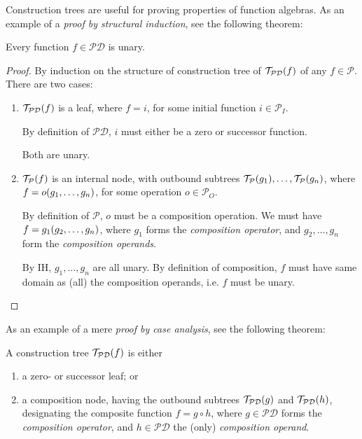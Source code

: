 Construction trees are useful for proving properties of function algebras.  As
an example of a \emph{proof by structural induction}, see the following
theorem:

\begin{theorem} \label{thm:p-functions-unary} Every function $f \in
\mathcal{PD}$ is unary. \end{theorem}

\begin{proof} By induction on the structure of construction tree of
$\mathcal{T}_\mathcal{PD}{\mathopen{}\left({f}\right)\mathclose{}}$ of any $f \in \mathcal{P}$. There are two
cases:\begin{enumerate}[label=(\arabic*)]

\item $\mathcal{T}_\mathcal{PD}{\mathopen{}\left({f}\right)\mathclose{}}$ is a leaf, where $f = i$, for some
initial function $i \in \mathcal{P}_I$.

By definition of $\mathcal{PD}$, $i$ must either be a zero or successor
function.

Both are unary.

\item $\mathcal{T}_\mathcal{P}{\mathopen{}\left({f}\right)\mathclose{}}$ is an internal node, with outbound subtrees
$\mathcal{T}_\mathcal{P}{\mathopen{}\left({g_1}\right)\mathclose{}}, \ldots, \mathcal{T}_\mathcal{P}{\mathopen{}\left({g_n}\right)\mathclose{}}$, where
$f = o{\mathopen{}\left({g_1, \ldots, g_n}\right)\mathclose{}}$, for some operation $o \in \mathcal{P}_O$.

By definition of $\mathcal{P}$, $o$ must be a composition operation. We must
have $f = g_1{\mathopen{}\left({g_2, \ldots, g_n}\right)\mathclose{}}$, where $g_1$ forms the \emph{composition
operator}, and $g_2, \ldots, g_n$ form the \emph{composition operands}.

By IH, $g_1, \ldots, g_n$ are all unary. By definition of composition, $f$ must
have same domain as (all) the composition operands, i.e. $f$ must be
unary.\end{enumerate}\end{proof}

As an example of a mere \emph{proof by case analysis}, see the following
theorem:

\begin{theorem} \label{thm:construction-tree-p} A construction tree
$\mathcal{T}_\mathcal{PD}{\mathopen{}\left({f}\right)\mathclose{}}$ is either\begin{enumerate}[label=(\arabic*)]

\item a zero- or successor leaf; or

\item a composition node, having the outbound subtrees
$\mathcal{T}_\mathcal{PD}{\mathopen{}\left({g}\right)\mathclose{}}$ and $\mathcal{T}_\mathcal{PD}{\mathopen{}\left({h}\right)\mathclose{}}$,
designating the composite function $f = g \circ h$, where $g \in \mathcal{PD}$
forms the \emph{composition operator}, and $h \in \mathcal{PD}$ the (only)
\emph{composition operand}.

\end{enumerate}\end{theorem}


